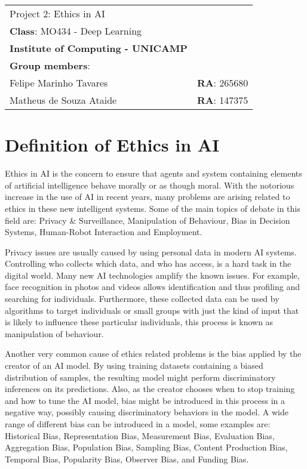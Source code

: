 \documentclass[
    11pt,
    a4paper,
    brazil
    ]{article}
\begin{document}
\begin{table}[H]
\begin{tabular}{ll}
{\Huge \centering  Project 2: Ethics in AI}\\
\textbf{Class}: MO434 - Deep Learning  \\
\vspace{1cm}
\textbf{Institute of Computing - UNICAMP}\\
\textbf{Group members}:\\
Felipe Marinho Tavares& \textbf{RA}: 265680\\
Matheus de Souza Ataide& \textbf{RA}: 147375\\
\end{tabular}
\end{table}

\section{Definition of Ethics in AI}
Ethics in AI is the concern to ensure that agents and system containing elements of artificial intelligence behave morally or as though moral. With the notorious increase in the use of AI in recent years, many problems are arising related to ethics in these new intelligent systems. Some of the main topics of debate in this field are: Privacy \& Surveillance, Manipulation of Behaviour, Bias in Decision Systems, Human-Robot Interaction and Employment. 

Privacy issues are usually caused by using personal data in modern AI systems. Controlling who collects which data, and who has access, is a hard task in the digital world. Many new AI technologies amplify the known issues. For example, face recognition in photos and videos allows identification and thus profiling and searching for individuals. Furthermore, these collected data can be used by algorithms to target individuals or small groups with just the kind of input that is likely to influence these particular individuals, this process is known as manipulation of behaviour.

Another very common cause of ethics related problems is the bias applied by the creator of an AI model. By using training datasets containing a biased distribution of samples, the resulting model might perform discriminatory inferences on its predictions. Also, as the creator chooses when to stop training and how to tune the AI model, bias might be introduced in this process in a negative way, possibly causing discriminatory behaviors in the model. A wide range of different bias can be introduced in a model, some examples are:  Historical Bias, Representation Bias, Measurement Bias, Evaluation Bias, Aggregation Bias, Population Bias, Sampling Bias, Content Production Bias, Temporal Bias, Popularity Bias, Observer Bias, and Funding Bias.
\end{document}
